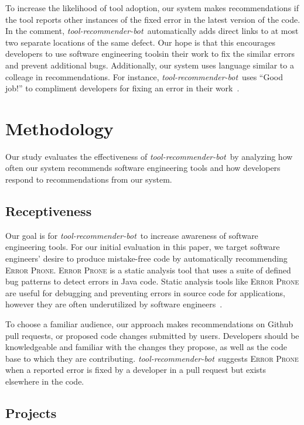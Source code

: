 \documentclass[sigconf,review,anonymous]{acmart}
\newcommand{\tool}{\textsl{tool-recommender-bot}}
\begin{document}
To increase the likelihood of tool adoption, our system makes recommendations if the tool reports other instances of the fixed error in the latest version of the code. In the comment, \tool~automatically adds direct links to at most two separate locations of the same defect. Our hope is that this encourages developers to use software engineering toolsin their work to fix the similar errors and prevent additional bugs. Additionally, our system uses language similar to a colleage in recommendations. For instance, \tool~uses ``Good job!'' to compliment developers for fixing an error in their work~\cite{?}.

\section{Methodology}

Our study evaluates the effectiveness of \tool~by analyzing how often our system recommends software engineering tools and how developers respond to recommendations from our system.

\subsection{Receptiveness}

Our goal is for \tool~to increase awareness of software engineering tools. For our initial evaluation in this paper, we target software engineers' desire to produce mistake-free code by automatically recommending \textsc{Error Prone}. \textsc{Error Prone} is a static analysis tool that uses a suite of defined bug patterns to detect errors in Java code. Static analysis tools like \textsc{Error Prone} are useful for debugging and preventing errors in source code for applications, however they are often underutilized by software engineers~\cite{Johnson2013Why}. 

To choose a familiar audience, our approach makes recommendations on Github pull requests, or proposed code changes submitted by users. Developers should be knowledgeable and familiar with the changes they propose, as well as the code base to which they are contributing. \tool~suggests \textsc{Error Prone} when a reported error is fixed by a developer in a pull request but exists elsewhere in the code. 

\subsection{Projects}
\end{document}
